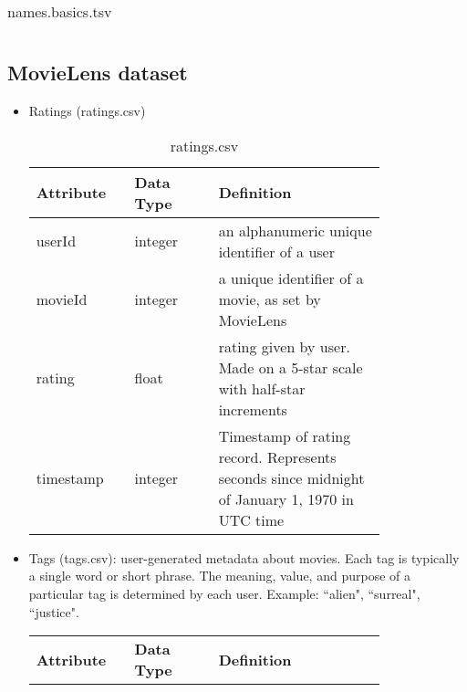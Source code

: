 \documentclass[10pt,titlepage]{article}
\begin{document}
\begin{itemize}
\begin{table}[H]
\begin{tabular}{p{0.2\linewidth} | p{0.2\linewidth} | p{0.4\linewidth}}
                \hline
            \end{tabular}
            \caption{names.basics.tsv}
            \label{tab:imdb_names}
        \end{table}
\end{itemize}


\pagebreak
\subsection{MovieLens dataset}
\begin{itemize}
    \item Ratings (ratings.csv)

        \begin{table}[H]
            \centering
            \begin{tabular}{p{0.2\linewidth} | p{0.2\linewidth} | p{0.4\linewidth}}
                \hline
                \textbf{Attribute} & \textbf{Data Type}  & \textbf{Definition}\\
                \hline
                userId & integer & an alphanumeric unique identifier of a user \\
                \hline
                movieId & integer & a unique identifier of a movie, as set by MovieLens \\
                \hline
                rating & float & rating given by user. Made on a 5-star scale with half-star increments \\
                \hline
                timestamp & integer & Timestamp of rating record. Represents seconds since midnight of January 1, 1970
                in UTC time \\
                \hline
            \end{tabular}
            \caption{ratings.csv}
            \label{tab:ml_ratings}
        \end{table}

    \item Tags (tags.csv): user-generated metadata about movies. Each tag is typically a single word or short phrase. The
        meaning, value, and purpose of a particular tag is determined by each user. Example: ``alien", ``surreal",
        ``justice".

        \begin{table}[H]
            \centering
            \begin{tabular}{p{0.2\linewidth} | p{0.2\linewidth} | p{0.4\linewidth}}
                \hline
                \textbf{Attribute} & \textbf{Data Type}  & \textbf{Definition}\\


\end{tabular}
\end{table}
\end{itemize}
\end{document}
